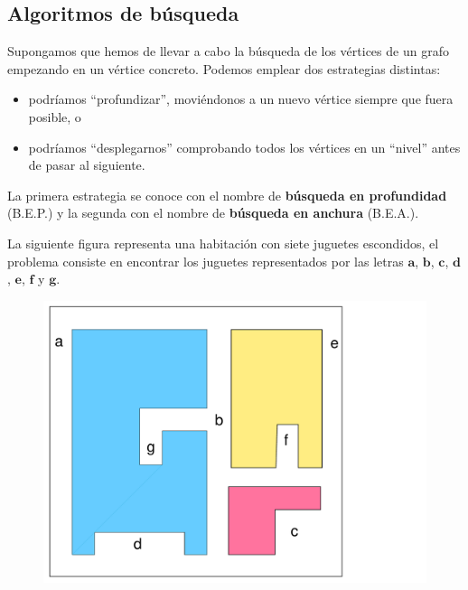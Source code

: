 \documentclass[twoside]{report}
\newcommand{\bs}[1]{\boldsymbol{#1}}
\begin{document}
\subsection{Algoritmos de búsqueda}

Supongamos que hemos de llevar a cabo la búsqueda de los vértices de un grafo em\-pe\-zan\-do en un vértice concreto.
Podemos emplear dos estrategias distintas:
        \begin{itemize}
            \item podríamos ``profundizar'', moviéndonos a un nuevo vértice siempre que fuera posible, o
            \vspace{-0.2cm}
            \item podríamos ``desplegarnos'' comprobando todos los vértices en un ``nivel'' antes de pasar al siguiente.
        \end{itemize}

\vspace{0.2cm}
La primera estrategia se conoce con el nombre de \textbf{búsqueda en profundidad} (B.E.P.) y la segunda con el nombre de
\textbf{búsqueda en anchura} (B.E.A.).
\vspace{0.2cm}

La siguiente figura representa una habitación con siete juguetes escondidos, el problema consiste en encontrar los juguetes representados por las
letras $\bs{a}$, $\bs{b}$, $\bs{c}$, $\bs{d}$, $\bs{e}$, $\bs{f}$ y $\bs{g}$.


      \begin{center}
           \begin{figure}[h!]\centering
           \includegraphics[scale=0.14]{pdfs/B1.pdf}
           \end{figure}
      \end{center}
\end{document}
